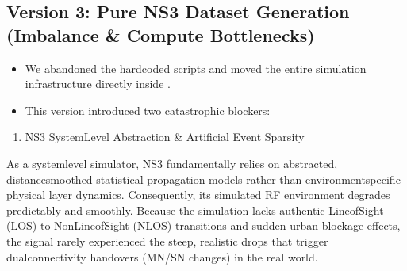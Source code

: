 \documentclass[letterpaper,10pt,english]{sphinxmanual}
\begin{document}
\subsection{Version 3: Pure NS\sphinxhyphen{}3 Dataset Generation (Imbalance \& Compute Bottlenecks)}
\label{\detokenize{dataset:version-3-pure-ns-3-dataset-generation-imbalance-compute-bottlenecks}}\begin{itemize}
\item {} 
\sphinxAtStartPar
{} We abandoned the hardcoded scripts and moved the entire simulation infrastructure directly inside .

\item {} 
\sphinxAtStartPar
{} This version introduced two catastrophic blockers:

\end{itemize}
\begin{enumerate}
%
\item {} 
\sphinxAtStartPar
NS\sphinxhyphen{}3 System\sphinxhyphen{}Level Abstraction \& Artificial Event Sparsity

\end{enumerate}

\sphinxAtStartPar
As a system\sphinxhyphen{}level simulator, NS\sphinxhyphen{}3 fundamentally relies on abstracted, distance\sphinxhyphen{}smoothed statistical propagation models rather than environment\sphinxhyphen{}specific physical layer dynamics. Consequently, its simulated RF environment degrades predictably and smoothly. Because the simulation lacks authentic Line\sphinxhyphen{}of\sphinxhyphen{}Sight (LOS) to Non\sphinxhyphen{}Line\sphinxhyphen{}of\sphinxhyphen{}Sight (NLOS) transitions and sudden urban blockage effects, the signal rarely experienced the steep, realistic drops that trigger dual\sphinxhyphen{}connectivity handovers (MN/SN changes) in the real world.
\end{document}
